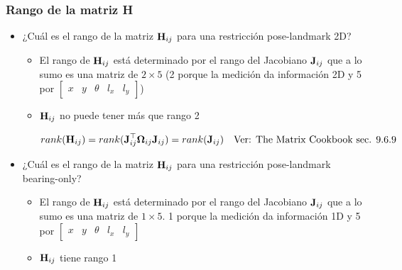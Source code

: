 \begin{frame}
    \frametitle{Rango de la matriz H}
    
    \begin{itemize}
        \item ¿Cuál es el rango de la matriz $\boldsymbol{\mathbf{H}}_{ij}$ para una restricción pose-landmark 2D?
        \begin{itemize}
            \item El rango de $\boldsymbol{\mathbf{H}}_{ij}$ está determinado por el rango del Jacobiano $\boldsymbol{\mathbf{J}}_{ij}$ que a lo sumo es una matriz de $2 \times 5$ (2 porque la medición da información 2D y 5 por $\begin{bmatrix}    x & y & \theta & l_{x} & l_{y} \end{bmatrix}$)
            \item $\boldsymbol{\mathbf{H}}_{ij}$ no puede tener más que rango 2
            
                $rank(\boldsymbol{\mathbf{H}}_{ij}) = rank(\boldsymbol{\mathbf{J}}_{ij}^{\top} \boldsymbol{\mathbf{\Omega}}_{ij} \boldsymbol{\mathbf{J}}_{ij}) = rank(\boldsymbol{\mathbf{J}}_{ij}) \quad \text{Ver: The Matrix Cookbook sec. 9.6.9}$ 
        \end{itemize}
    
        \item ¿Cuál es el rango de la matriz $\boldsymbol{\mathbf{H}}_{ij}$ para una restricción pose-landmark bearing-only?
        \begin{itemize}
            \item El rango de $\boldsymbol{\mathbf{H}}_{ij}$ está determinado por el rango del Jacobiano $\boldsymbol{\mathbf{J}}_{ij}$ que a lo sumo es una matriz de $1 \times 5$. 1 porque la medición da información 1D y 5 por $\begin{bmatrix}    x & y & \theta & l_{x} & l_{y} \end{bmatrix}$
            \item $\boldsymbol{\mathbf{H}}_{ij}$ tiene rango 1
        \end{itemize}
        
    \end{itemize}
\end{frame}

